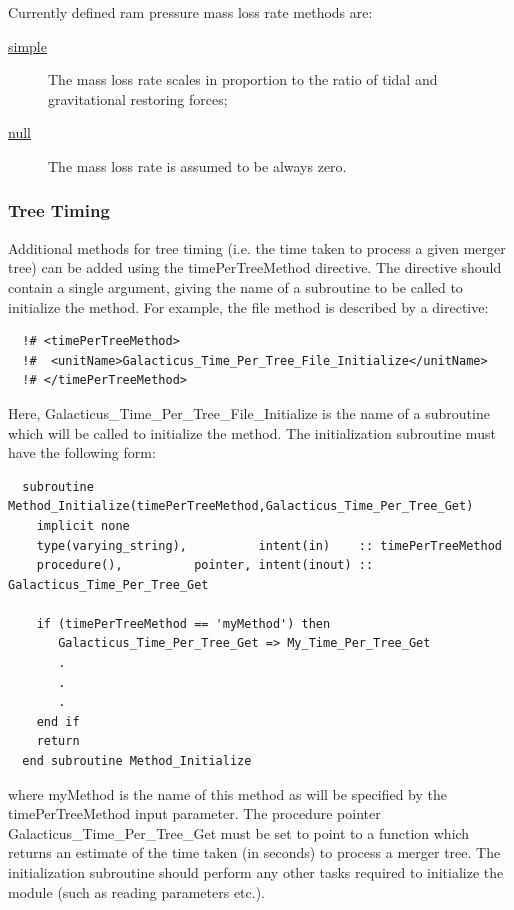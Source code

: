Currently defined ram pressure mass loss rate methods are:
\begin{description}
 \item [\hyperlink{tidal_stripping.mass_loss_rate.disks.simple.F90:tidal_stripping_mass_loss_rate_disks_simple:tidal_stripping_mass_loss_rate_disk_simple}{{\normalfont \ttfamily simple}}] The mass loss rate scales in proportion to the ratio of tidal and gravitational restoring forces;
 \item [\hyperlink{tidal_stripping.mass_loss_rate.disks.null.F90:tidal_stripping_mass_loss_rate_disks_null:tidal_stripping_mass_loss_rate_disk_null}{{\normalfont \ttfamily null}}] The mass loss rate is assumed to be always zero.
\end{description}

\subsubsection{Tree Timing}

Additional methods for tree timing (i.e. the time taken to process a given merger tree) can be added using the {\normalfont \ttfamily timePerTreeMethod} directive. The directive should contain a single argument, giving the name of a subroutine to be called to initialize the method. For example, the {\normalfont \ttfamily file} method is described by a directive:
\begin{verbatim}
  !# <timePerTreeMethod>
  !#  <unitName>Galacticus_Time_Per_Tree_File_Initialize</unitName>
  !# </timePerTreeMethod>
\end{verbatim}
Here, {\normalfont \ttfamily Galacticus\_Time\_Per\_Tree\_File\_Initialize} is the name of a subroutine which will be called to initialize the method. The initialization subroutine must have the following form:
\begin{verbatim}
  subroutine Method_Initialize(timePerTreeMethod,Galacticus_Time_Per_Tree_Get)
    implicit none
    type(varying_string),          intent(in)    :: timePerTreeMethod
    procedure(),          pointer, intent(inout) :: Galacticus_Time_Per_Tree_Get
    
    if (timePerTreeMethod == 'myMethod') then
       Galacticus_Time_Per_Tree_Get => My_Time_Per_Tree_Get
       .
       .
       .
    end if
    return
  end subroutine Method_Initialize
\end{verbatim}
where {\normalfont \ttfamily myMethod} is the name of this method as will be specified by the {\normalfont \ttfamily timePerTreeMethod} input parameter. The procedure pointer {\normalfont \ttfamily Galacticus\_Time\_Per\_Tree\_Get} must be set to point to a function which returns an estimate of the time taken (in seconds) to process a merger tree. The initialization subroutine should perform any other tasks required to initialize the module (such as reading parameters etc.).

